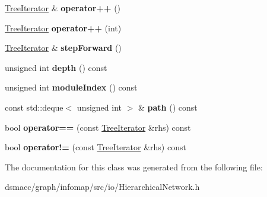 \begin{DoxyCompactItemize}
\mbox{\hyperlink{classTreeIterator}{Tree\+Iterator}} \& {\bfseries operator++} ()
\item 
\mbox{\label{classTreeIterator_a247e9d3c5fbec0a7890fb914f39b57ca}} 
\mbox{\hyperlink{classTreeIterator}{Tree\+Iterator}} {\bfseries operator++} (int)
\item 
\mbox{\label{classTreeIterator_ad0cfb2fe6ad349223b23f4c7233743d1}} 
\mbox{\hyperlink{classTreeIterator}{Tree\+Iterator}} \& {\bfseries step\+Forward} ()
\item 
\mbox{\label{classTreeIterator_a07c5dae440cfbf91808da25ec62e24b6}} 
unsigned int {\bfseries depth} () const
\item 
\mbox{\label{classTreeIterator_a03db820384c277af22d30ae6464643a0}} 
unsigned int {\bfseries module\+Index} () const
\item 
\mbox{\label{classTreeIterator_a4c00703a9762163d0e2b9e66bbaf488c}} 
const std\+::deque$<$ unsigned int $>$ \& {\bfseries path} () const
\item 
\mbox{\label{classTreeIterator_afcb8cbeb3c2d430b9bc714c1a849f902}} 
bool {\bfseries operator==} (const \mbox{\hyperlink{classTreeIterator}{Tree\+Iterator}} \&rhs) const
\item 
\mbox{\label{classTreeIterator_a1908f6a8f58c0a982c629a753acf8ff4}} 
bool {\bfseries operator!=} (const \mbox{\hyperlink{classTreeIterator}{Tree\+Iterator}} \&rhs) const
\end{DoxyCompactItemize}


The documentation for this class was generated from the following file\+:\begin{DoxyCompactItemize}
\item 
dsmacc/graph/infomap/src/io/Hierarchical\+Network.\+h\end{DoxyCompactItemize}
